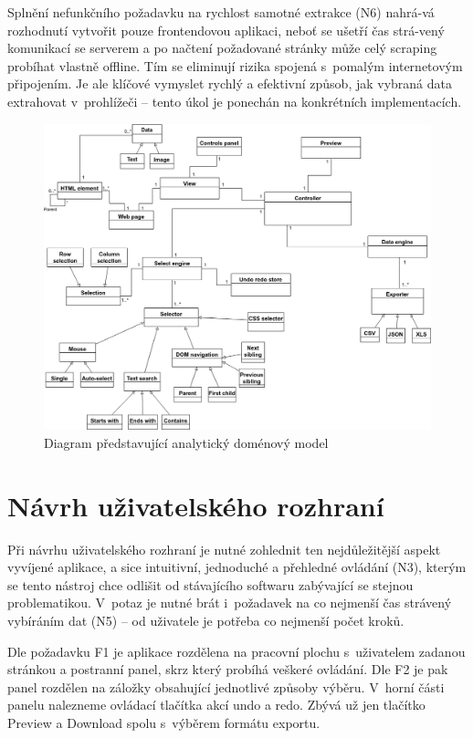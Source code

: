 \documentclass[thesis=B,czech]{FITthesis}[2012/06/26]
\begin{document}
Splnění nefunkčního požadavku na rychlost samotné extrakce (N6) nahrá-vá rozhodnutí vytvořit pouze frontendovou aplikaci, neboť se ušetří čas strá-vený komunikací se serverem a po načtení požadované stránky může celý scraping probíhat vlastně offline. Tím se eliminují rizika spojená s~pomalým internetovým připojením. Je ale klíčové vymyslet rychlý a efektivní způsob, jak vybraná data extrahovat v~prohlížeči -- tento úkol je ponechán na konkrétních implementacích.

\begin{figure}
	\includegraphics[width=\linewidth]{images/conceptual_diagram.png}
	\caption[Analytický doménový model]{Diagram představující analytický doménový model}
	\label{fig:conceptual_diagram}
\end{figure}

\newpage
\section{Návrh uživatelského rozhraní}
Při návrhu uživatelského rozhraní je nutné zohlednit ten nejdůležitější aspekt vyvíjené aplikace, a sice intuitivní, jednoduché a přehledné ovládání (N3), kterým se tento nástroj chce odlišit od stávajícího softwaru zabývající se stejnou problematikou. V~potaz je nutné brát i~požadavek na co nejmenší čas strávený vybíráním dat (N5) -- od uživatele je potřeba co nejmenší počet kroků.

Dle požadavku F1 je aplikace rozdělena na pracovní plochu s~uživatelem zadanou stránkou a postranní panel, skrz který probíhá veškeré ovládání. Dle F2 je pak panel rozdělen na záložky obsahující jednotlivé způsoby výběru. V~horní části panelu nalezneme ovládací tlačítka akcí undo a redo. Zbývá už jen tlačítko \textsf{Preview} a \textsf{Download} spolu s~výběrem formátu exportu.
\end{document}
